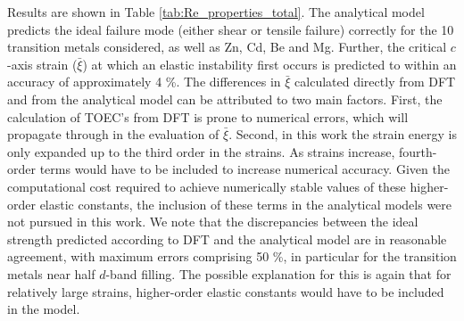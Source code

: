 \documentclass[showpacs,aps,floatfix,prb,reprint,superscriptaddress]{revtex4-1}
\begin{document}
Results are shown in Table \ref{tab:Re_properties_total}. The analytical model predicts the ideal failure mode (either shear or tensile failure) correctly for the 10 transition metals considered, as well as Zn, Cd, Be and Mg.  Further, the critical $c$-axis strain ($\bar{\xi}$) at which an elastic instability first occurs is predicted to within an accuracy of approximately 4 \%. The differences in $\bar{\xi}$ calculated directly from DFT and from the analytical model can be attributed to two main factors. First, the calculation of TOEC's from DFT is prone to numerical errors, which will propagate through in the evaluation of $\bar{\xi}$. Second, in this work the strain energy is only expanded up to the third order in the strains. As strains increase, fourth-order terms would have to be included to increase numerical accuracy. Given the computational cost required to achieve numerically stable values of these higher-order elastic constants, the inclusion of these terms in the analytical models were not pursued in this work. We note that the discrepancies between the ideal strength predicted according to DFT and the analytical model are in reasonable agreement, with maximum errors comprising 50 \%, in particular for the transition metals near half $d$-band filling. The possible explanation for this is again that for relatively large strains, higher-order elastic constants would have to be included in the model.

\end{document}
